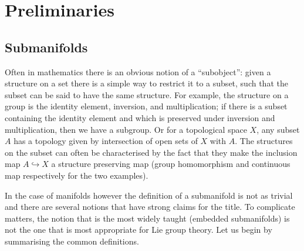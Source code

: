 
\chapter{Preliminaries}

\section{Submanifolds}

Often in mathematics there is an obvious notion of a ``subobject'': given a structure on a set there is a simple way to restrict it to a subset, such that the subset can be said to have the same structure.
For example, the structure on a group is the identity element, inversion, and multiplication; if there is a subset containing the identity element and which is preserved under inversion and multiplication, then we have a subgroup.
Or for a topological space $X$, any subset $A$ has a topology given by intersection of open sets of $X$ with $A$.
The structures on the subset can often be characterised by the fact that they make the inclusion map $A \hookrightarrow X$ a structure preserving map (group homomorphism and continuous map respectively for the two examples).

In the case of manifolds however the definition of a submanifold is not as trivial and there are several notions that have strong claims for the title.
To complicate matters, the notion that is the most widely taught (embedded submanifolds) is not the one that is most appropriate for Lie group theory.
Let us begin by summarising the common definitions.

